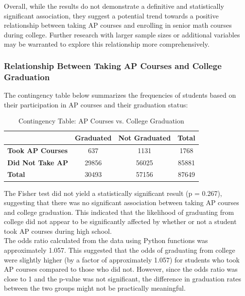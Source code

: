\documentclass[sn-mathphys-num]{sn-jnl}%
\theoremstyle{thmstyleone}%
\theoremstyle{thmstyletwo}%
\theoremstyle{thmstylethree}%
\begin{document}
{Overall, while the results do not demonstrate a definitive and statistically significant association, they suggest a potential trend towards a positive relationship between taking AP courses and enrolling in senior math courses during college. Further research with larger sample sizes or additional variables may be warranted to explore this relationship more comprehensively.\\

\subsubsection{Relationship Between Taking AP Courses and College Graduation}
\label{sub:graduation}

The contingency table below summarizes the frequencies of students based on their participation in AP courses and their graduation status:\\

\begin{table}[htbp]
\centering
\caption{Contingency Table: AP Courses vs. College Graduation}
\begin{tabular}{|l|c|c|c|}
\hline
 & \textbf{Graduated} & \textbf{Not Graduated} & \textbf{Total} \\ \hline
\textbf{Took AP Courses} & 637 & 1131 & 1768 \\ \hline
\textbf{Did Not Take AP} & 29856 & 56025 & 85881 \\
\hline
\textbf{Total} & 30493 & 57156 & 87649 \\ \hline
\end{tabular}
\end{table}

The Fisher test did not yield a statistically significant result (p = 0.267), suggesting that there was no significant association between taking AP courses and college graduation. This indicated that the likelihood of graduating from college did not appear to be significantly affected by whether or not a student took AP courses during high school.\\

The odds ratio calculated from the data using Python functions was approximately 1.057. This suggested that the odds of graduating from college were slightly higher (by a factor of approximately 1.057) for students who took AP courses compared to those who did not. However, since the odds ratio was close to 1 and the p-value was not significant, the difference in graduation rates between the two groups might not be practically meaningful.\\

}
\end{document}

